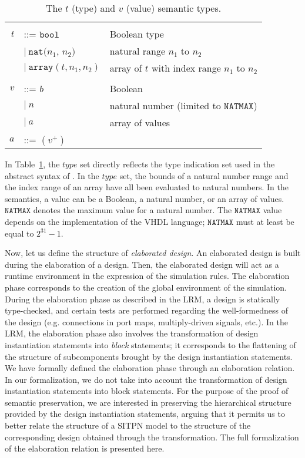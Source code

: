 \begin{table}[!htbp]
  \caption{The $t$ (type) and $v$ (value) semantic types.}
  \label{tab:type-value}

  \begin{tabular}{|rll|}
    \hline
    && \\
    $t$ & ::= $\mathtt{bool}$ & Boolean type \\
    & \quad $\vert~\mathtt{nat}(n_1$, $n_2)$ & natural range $n_1$ to $n_2$ \\
    & \quad $\vert~\mathtt{array}(t, n_1, n_2)$ & array of $t$ with index range $n_1$ to $n_2$ \\
    & & \\
    $v$ & ::= $b$ & Boolean \\
    & \quad $\vert~{}n$ & natural number (limited to $\mathtt{NATMAX}$) \\
    & \quad $\vert~a$ & array of values \\
    $a$ & ::= $(v^{+})$ & \\
    \hline
  \end{tabular}    
\end{table}

In Table~\ref{tab:type-value}, the $type$ set directly reflects the
type indication set used in the abstract syntax of \hvhdl{}. In the
$type$ set, the bounds of a natural number range and the index range
of an array have all been evaluated to natural numbers. In the
\hvhdl{} semantics, a value can be a Boolean, a natural number, or an
array of values. $\mathtt{NATMAX}$ denotes the maximum value for a
natural number.  The $\mathtt{NATMAX}$ value depends on the
implementation of the \textsf{VHDL} language; $\mathtt{NATMAX}$ must
at least be equal to $2^{31}-1$.

Now, let us define the structure of \textit{elaborated design}. An
elaborated design is built during the elaboration of a \hvhdl{}
design. Then, the elaborated design will act as a runtime environment
in the expression of the simulation rules. The elaboration phase
corresponds to the creation of the global environment of the
simulation. During the elaboration phase as described in the LRM, a
design is statically type-checked, and certain tests are performed
regarding the well-formedness of the design (e.g. connections in port
maps, multiply-driven signals, etc.). In the LRM, the elaboration
phase also involves the transformation of design instantiation
statements into \textit{block} statements; it corresponds to the
flattening of the structure of subcomponents brought by the design
instantiation statements. We have formally defined the elaboration
phase through an elaboration relation. In our formalization, we do not
take into account the transformation of design instantiation
statements into block statements. For the purpose of the proof of
semantic preservation, we are interested in preserving the
hierarchical structure provided by the design instantiation
statements, arguing that it permits us to better relate the structure
of a SITPN model to the structure of the corresponding \hvhdl{} design
obtained through the \hilecop{} transformation. The full formalization
of the elaboration relation is presented here\cite{Iampietro2021}.

